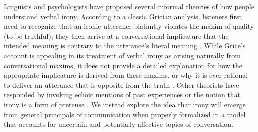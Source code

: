 \documentclass[10pt,letterpaper]{article}
\begin{document}
Linguists and psychologists have proposed several informal theories of how people understand verbal irony. According to a classic Grician analysis, listeners first need to recognize that an ironic utterance blatantly violates the maxim of quality (to be truthful); they then arrive at a conversational implicature that the intended meaning is contrary to the utterance's literal meaning \cite{grice20134, wilson2006pragmatics}. While Grice's account is appealing in its treatment of verbal irony as arising naturally from conversational maxims, it does not provide a detailed explanation for how the appropriate implicature is derived from these maxims, or why it is ever rational to deliver an utterance that is opposite from the truth \cite{wilson2006pragmatics}. 
Other theorists have responded by invoking echoic mentions of past experiences \cite{sperber1981irony, jorgensen1984test} or the notion that irony is a form of pretense \cite{clark1984pretense}.
We instead explore the idea that irony will emerge from general principals of communication when properly formalized in a model that accounts for uncertain and potentially affective topics of conversation.

%
%
\end{document}
